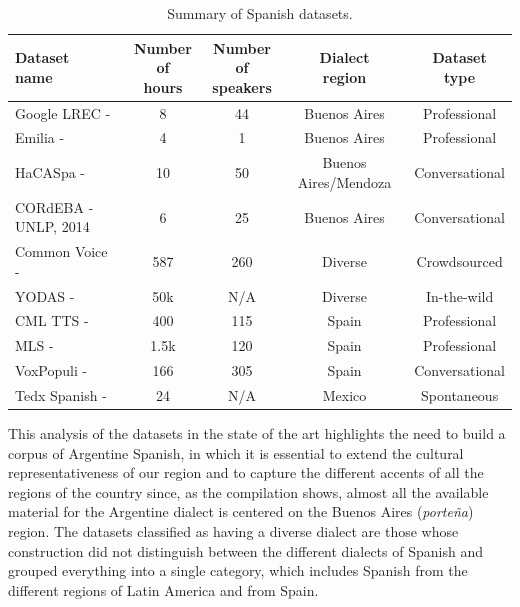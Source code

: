 \begin{table}[ht]
\centering
\small
\caption{Summary of Spanish datasets.}
\label{tab:datasets_resumen}
\begin{tabularx}{\textwidth}{@{} X c c c c @{}}
\toprule
\makecell[c]{\textbf{Dataset} \\ \textbf{name}} &
\makecell[c]{\textbf{Number of} \\ \textbf{hours}} &
\makecell[c]{\textbf{Number of} \\ \textbf{speakers}} &
\makecell[c]{\textbf{Dialect} \\ \textbf{region}} &
\makecell[c]{\textbf{Dataset} \\ \textbf{type}} \\
\midrule
Google LREC - \cite{google-arg} & 8    & 44  & Buenos Aires                & Professional    \\
Emilia - \cite{datset_arg}           & 4    & 1   & Buenos Aires                & Professional    \\
HaCASpa - \cite{dataset_hamburg}        & 10   & 50  & Buenos Aires/Mendoza      & Conversational \\
CORdEBA - UNLP, 2014            & 6    & 25  & Buenos Aires                & Conversational \\
Common Voice - \cite{common-voice}         & 587  & 260 & Diverse                     & Crowdsourced    \\
YODAS - \cite{yodas-data}                & 50k  & N/A & Diverse                     & In-the-wild    \\
CML TTS - \cite{cml-dataset}         & 400  & 115 & Spain                       & Professional    \\
MLS - \cite{MLS-dataset}         & 1.5k  & 120 & Spain                       & Professional    \\
VoxPopuli - \cite{voxpopuli}         & 166  & 305 & Spain                       & Conversational \\
Tedx Spanish - \cite{tedx-dataset}  & 24   & N/A & Mexico                      & Spontaneous     \\
\bottomrule
\end{tabularx}
\end{table}

This analysis of the datasets in the state of the art highlights the need to build a corpus of Argentine Spanish, in which it is essential to extend the cultural representativeness of our region and to capture the different accents of all the regions of the country since, as the compilation shows, almost all the available material for the Argentine dialect is centered on the Buenos Aires (\textit{porteña}) region. The datasets classified as having a diverse dialect are those whose construction did not distinguish between the different dialects of Spanish and grouped everything into a single category, which includes Spanish from the different regions of Latin America and from Spain.
